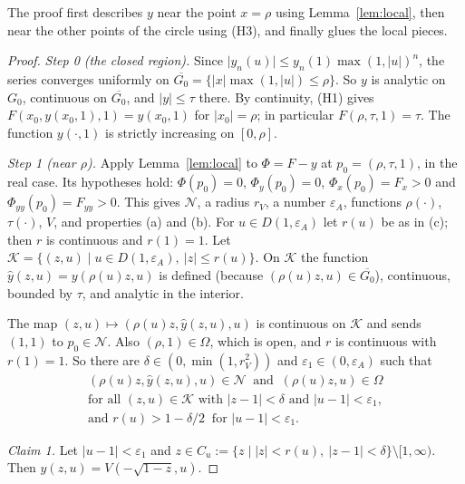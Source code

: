 \documentclass[11pt]{amsart}
\theoremstyle{definition}
\theoremstyle{remark}
\numberwithin{equation}{section}
\newcommand{\cK}{\mathcal{K}}
\newcommand{\cN}{\mathcal{N}}
\newcommand{\abs}[1]{\lvert #1\rvert}
\begin{document}
The proof first describes \(y\) near the point \(x=\rho\) using Lemma~\ref{lem:local}, then near the other points of the circle using (H3), and finally glues the local pieces.

\begin{proof}
\emph{Step 0 (the closed region).} Since \(\abs{y_n(u)}\le y_n(1)\max(1,\abs{u})^n\), the series converges uniformly on \(\overline{G_0}=\{\abs{x}\max(1,\abs{u})\le\rho\}\). So \(y\) is analytic on \(G_0\), continuous on \(\overline{G_0}\), and \(\abs{y}\le\tau\) there. By continuity, (H1) gives \(F(x_0,y(x_0,1),1)=y(x_0,1)\) for \(\abs{x_0}=\rho\); in particular \(F(\rho,\tau,1)=\tau\). The function \(y(\cdot,1)\) is strictly increasing on \([0,\rho]\).

\emph{Step 1 (near \(\rho\)).} Apply Lemma~\ref{lem:local} to \(\Phi=F-y\) at \(p_0=(\rho,\tau,1)\), in the real case. Its hypotheses hold: \(\Phi(p_0)=0\), \(\Phi_y(p_0)=0\), \(\Phi_x(p_0)=F_x>0\) and \(\Phi_{yy}(p_0)=F_{yy}>0\). This gives \(\cN\), a radius \(r_V\), a number \(\varepsilon_A\), functions \(\rho(\cdot)\), \(\tau(\cdot)\), \(V\), and properties (a) and (b). For \(u\in D(1,\varepsilon_A)\) let \(r(u)\) be as in (c); then \(r\) is continuous and \(r(1)=1\). Let \(\cK=\{(z,u)\mid u\in D(1,\varepsilon_A),\ \abs{z}\le r(u)\}\). On \(\cK\) the function \(\hat y(z,u)=y(\rho(u)z,u)\) is defined (because \((\rho(u)z,u)\in\overline{G_0}\)), continuous, bounded by \(\tau\), and analytic in the interior.

The map \((z,u)\mapsto(\rho(u)z,\hat y(z,u),u)\) is continuous on \(\cK\) and sends \((1,1)\) to \(p_0\in\cN\). Also \((\rho,1)\in\Omega\), which is open, and \(r\) is continuous with \(r(1)=1\). So there are \(\delta\in(0,\min(1,r_V^2))\) and \(\varepsilon_1\in(0,\varepsilon_A)\) such that
\begin{equation}\label{eq:nbhd}
\begin{gathered}
(\rho(u)z,\hat y(z,u),u)\in\cN\ \text{ and }\ (\rho(u)z,u)\in\Omega\\
\text{for all }(z,u)\in\cK\text{ with }\abs{z-1}<\delta\text{ and }\abs{u-1}<\varepsilon_1,\\
\text{and } r(u)>1-\delta/2\ \text{ for }\abs{u-1}<\varepsilon_1 .
\end{gathered}
\end{equation}

\emph{Claim 1.} Let \(\abs{u-1}<\varepsilon_1\) and \(z\in C_u:=\{z\mid\abs{z}<r(u),\ \abs{z-1}<\delta\}\setminus[1,\infty)\). Then \(\hat y(z,u)=V(-\sqrt{1-z},u)\).


\end{proof}
\end{document}
